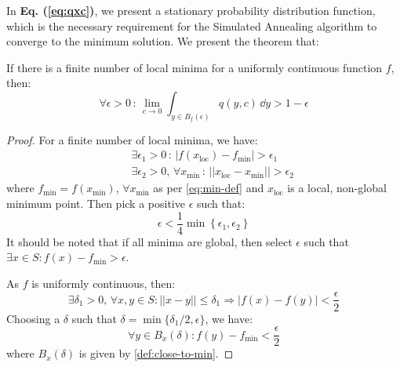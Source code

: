 In \textbf{Eq. (\ref{eq:qxc})}, we present a stationary probability distribution function, which is the necessary requirement for the Simulated Annealing algorithm to converge to the minimum solution. We present the theorem that:
\begin{theorem}
If there is a finite number of local minima for a uniformly continuous function $f$, then:
\begin{equation}
    \forall \epsilon > 0 \, : \, \lim_{c \rightarrow 0} \int_{y \in B_f(\epsilon)} q(y,c) \, \dd y > 1-\epsilon
\end{equation}
\label{thm:convergence-sa}
\begin{proof}
For a finite number of local minima, we have:
\begin{eqnarray}
\label{eqn:x-loc-x-min}
    && \exists \epsilon_1 > 0 \, : \, |f(x_{\text{loc}}) - f_{\min}| > \epsilon_1 \\
    && \exists \epsilon_2 > 0, \, \forall x_{\min} \, : \, ||x_{\text{loc}} - x_{\min}|| > \epsilon_2 
\end{eqnarray}
where $f_{\min} = f(x_{\min})$, $\forall x_{\min}$ as per \cref{eq:min-def} and $x_{\text{loc}}$ is a local, non-global minimum point. Then pick a positive $\epsilon$ such that: 
\begin{equation}
    \epsilon < \dfrac{1}{4}\min \left\lbrace \epsilon_1, \epsilon_2 \right\rbrace
    \label{eqn:eps-one-fourth-min}
\end{equation}
It should be noted that if all minima are global, then select $\epsilon$ such that $\exists x \in S : f(x) - f_{\min} > \epsilon$.

\vspace{5pt}

\noindent As $f$ is uniformly continuous, then:
\begin{equation}
    \exists \delta_1 > 0, \, \forall x,y \in S : ||x-y|| \leq \delta_1 \Longrightarrow |f(x)-f(y)| < \dfrac{\epsilon}{2}
\end{equation}
Choosing a $\delta$ such that $\delta = \min \{ \delta_1/2, \epsilon \}$, we have:
\begin{equation}
    \forall y \in B_x(\delta) : f(y) - f_{\min} < \dfrac{\epsilon}{2}
\end{equation}
where $B_x(\delta)$ is given by \cref{def:close-to-min}. \vspace{5pt}


\end{proof}
\end{theorem}
